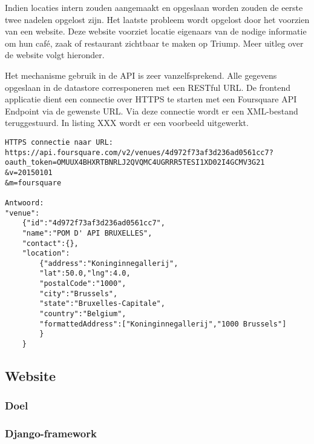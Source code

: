 Indien locaties intern zouden aangemaakt en opgeslaan worden zouden de eerste twee nadelen opgelost zijn. 
Het laatste probleem wordt opgelost door het voorzien van een website. Deze website voorziet locatie eigenaars van de nodige informatie om hun café, zaak of restaurant zichtbaar te maken op Triump. Meer uitleg over de website volgt hieronder.


Het mechanisme gebruik in de API is zeer vanzelfsprekend. Alle gegevens opgeslaan in de datastore corresponeren met een RESTful URL. De frontend applicatie dient een connectie over HTTPS te starten met een Foursquare API Endpoint via de gewenste URL. Via deze connectie wordt er een XML-bestand teruggestuurd. In listing XXX wordt er een voorbeeld uitgewerkt.

\begin{lstlisting}
HTTPS connectie naar URL:
https://api.foursquare.com/v2/venues/4d972f73af3d236ad0561cc7?
oauth_token=OMUUX4BHXRTBNRLJ2QVQMC4UGRRR5TESI1XD02I4GCMV3G21
&v=20150101
&m=foursquare

Antwoord:
"venue":
	{"id":"4d972f73af3d236ad0561cc7",
	"name":"POM D' API BRUXELLES",
	"contact":{},
	"location":
		{"address":"Koninginnegallerij",
		"lat":50.0,"lng":4.0,
		"postalCode":"1000",
		"city":"Brussels",
		"state":"Bruxelles-Capitale",
		"country":"Belgium",
		"formattedAddress":["Koninginnegallerij","1000 Brussels"]
		}
	}
\end{lstlisting}






 
\subsection{Website}
\subsubsection{Doel}
\subsubsection{Django-framework}

